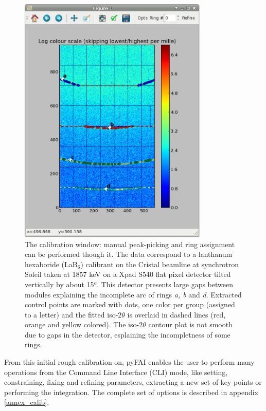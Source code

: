 \documentclass{iucr}
\begin{document}
\begin{figure}
\label{calib}
\begin{center}
\includegraphics[width=9cm]{calib_xpad.eps}
\caption{The calibration window: manual peak-picking and
ring assignment can be performed though it.
The data correspond to a lanthanum hexaboride (LaB$_6$) calibrant on the Cristal
beamline at synchrotron Soleil taken at 1857 keV on a Xpad S540 flat pixel
detector tilted vertically by about 15$^o$.
This detector presents large gaps between modules explaining the incomplete arc
of rings \textit{a, b} and \textit{d}.
Extracted control points are marked with dots, one color per group (assigned to
a letter) and the fitted iso-$2\theta$ is overlaid in dashed lines
(red, orange and yellow colored).
The iso-$2\theta$ contour plot is not smooth due to gaps in the
detector, esplaining the incompletness of some rings.}
\end{center}
\end{figure}

From this initial rough calibration on, pyFAI enables  the user to perform
many operations from the Command Line Interface (CLI) mode, like setting,
constraining, fixing and  refining parameters, extracting a new set of
key-points or performing the integration.
The complete set of options is described in appendix \ref{annex_calib}.
\end{document}
